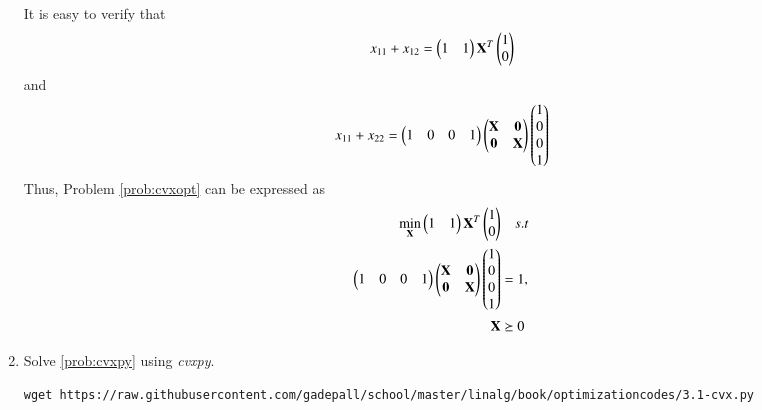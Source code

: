 \begin{enumerate}[label=\arabic*.,ref=\thesubsection.\theenumi]
\solution
It is easy to verify that
\begin{equation}
x_{11} + x_{12} = 
\begin{pmatrix}
1 & 1
\end{pmatrix}
\mathbf{X}^{T}
\begin{pmatrix}
1 
\\
0
\end{pmatrix}
\end{equation}
and
\begin{equation}
x_{11} + x_{22} = 
\begin{pmatrix}
1 & 0 & 0 & 1
\end{pmatrix}
\begin{pmatrix}
\mathbf{X} & \mathbf{0} \\
\mathbf{0} & \mathbf{X}
\end{pmatrix}
\begin{pmatrix}
1
\\
0 
\\
0
\\
1
\end{pmatrix}
\end{equation}
%
Thus, Problem \ref{prob:cvxopt} can be expressed as
\begin{equation}
\begin{split}
\min_{\mathbf{X}} 
\begin{pmatrix}
1 & 1
\end{pmatrix}
\mathbf{X}^{T}
\begin{pmatrix}
1 
\\
0
\end{pmatrix}
& \quad s.t
\\
\begin{pmatrix}
1 & 0 & 0 & 1
\end{pmatrix}
\begin{pmatrix}
\mathbf{X} & \mathbf{0} \\
\mathbf{0} & \mathbf{X}
\end{pmatrix}
\begin{pmatrix}
1
\\
0 
\\
0
\\
1
\end{pmatrix}
&=1,
\\
\mathbf{X}
 & \succeq 0 
\end{split}
\label{prob:cvxpy}
\end{equation}
%	
\item
Solve \eqref{prob:cvxpy} using {\em cvxpy}.

%
\solution
\begin{lstlisting}
wget https://raw.githubusercontent.com/gadepall/school/master/linalg/book/optimizationcodes/3.1-cvx.py
\end{lstlisting}


\end{enumerate}

